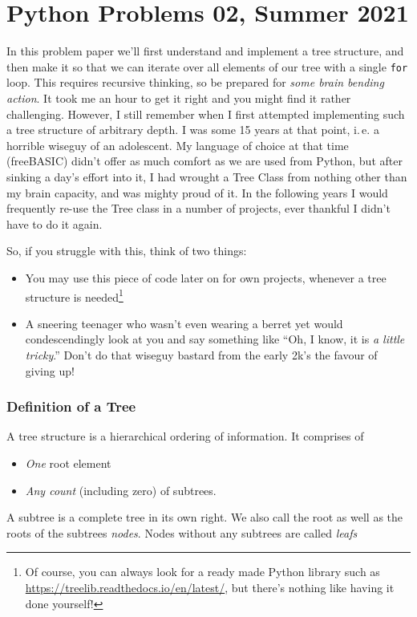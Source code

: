 \documentclass[
	english,
	fontsize=10pt,
	parskip=half,
	titlepage=true,
	DIV=12
]{scrartcl}
\newcommand*{\inPy}[1]{\texttt{#1}}
\newcommand*{\ie}{i.\,e.\xspace}
\begin{document}
\part*{Python Problems 02, Summer 2021}

In this problem paper we'll first understand and implement a tree structure, and then make it so that we can iterate over all elements of our tree with a single \inPy{for} loop. This requires recursive thinking, so be prepared for \emph{some brain bending action}. It took me an hour to get it right and you might find it rather challenging. However, I still remember when I first attempted implementing such a tree structure of arbitrary depth. I was some 15 years at that point, \ie a horrible wiseguy of an adolescent. My language of choice at that time (freeBASIC) didn't offer as much comfort as we are used from Python, but after sinking a day's effort into it, I had wrought a Tree Class from nothing other than my brain capacity, and was mighty proud of it. In the following years I would frequently re-use the Tree class in a number of projects, ever thankful I didn't have to do it again.

So, if you struggle with this, think of two things:
\begin{itemize}
\item You may use this piece of code later on for own projects, whenever a tree structure is needed\footnote{Of course, you can always look for a ready made Python 
	library such as \url{https://treelib.readthedocs.io/en/latest/}, but there's nothing like having it done yourself!}
\item A sneering teenager who wasn't even wearing a berret yet would condescendingly look at you and say something like \enquote{Oh, I know, it is \emph{a little
	tricky}.} Don't do that wiseguy bastard from the early 2k's the favour of giving up!
\end{itemize}

\section{Definition of a Tree}
A tree structure is a hierarchical ordering of information. It comprises of
\begin{itemize}
\item \emph{One} root element
\item \emph{Any count} (including zero) of subtrees.
\end{itemize}
A subtree is a complete tree in its own right. We also call the root as well as the roots of the subtrees \emph{nodes}. Nodes without any subtrees are called \emph{leafs}
\end{document}
